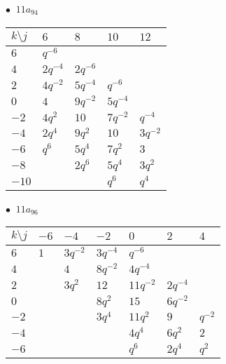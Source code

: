 \begin{minipage}{\linewidth}
$\bullet\ $ $11a_{94}$ \vspace{0.5em} \\
\begin{tabular}{l|llll}
$k \setminus j$ & $6$ & $8$ & $10$ & $12$ \\
\hline
$6$ & $q^{-6}$ &  &  &  \\
$4$ & $2q^{-4}$ & $2q^{-6}$ &  &  \\
$2$ & $4q^{-2}$ & $5q^{-4}$ & $q^{-6}$ &  \\
$0$ & $4$ & $9q^{-2}$ & $5q^{-4}$ &  \\
$-2$ & $4q^{2}$ & $10$ & $7q^{-2}$ & $q^{-4}$ \\
$-4$ & $2q^{4}$ & $9q^{2}$ & $10$ & $3q^{-2}$ \\
$-6$ & $q^{6}$ & $5q^{4}$ & $7q^{2}$ & $3$ \\
$-8$ &  & $2q^{6}$ & $5q^{4}$ & $3q^{2}$ \\
$-10$ &  &  & $q^{6}$ & $q^{4}$ \\
\end{tabular}
\vspace{2em}
\end{minipage}
%
\begin{minipage}{\linewidth}
$\bullet\ $ $11a_{96}$ \vspace{0.5em} \\
\begin{tabular}{l|llllll}
$k \setminus j$ & $-6$ & $-4$ & $-2$ & $0$ & $2$ & $4$ \\
\hline
$6$ & $1$ & $3q^{-2}$ & $3q^{-4}$ & $q^{-6}$ &  &  \\
$4$ &  & $4$ & $8q^{-2}$ & $4q^{-4}$ &  &  \\
$2$ &  & $3q^{2}$ & $12$ & $11q^{-2}$ & $2q^{-4}$ &  \\
$0$ &  &  & $8q^{2}$ & $15$ & $6q^{-2}$ &  \\
$-2$ &  &  & $3q^{4}$ & $11q^{2}$ & $9$ & $q^{-2}$ \\
$-4$ &  &  &  & $4q^{4}$ & $6q^{2}$ & $2$ \\
$-6$ &  &  &  & $q^{6}$ & $2q^{4}$ & $q^{2}$ \\
\end{tabular}
\vspace{2em}
\end{minipage}
%
